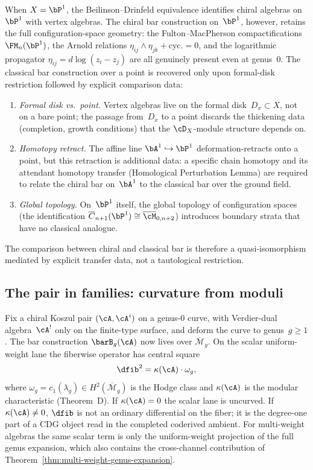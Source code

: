 When $X = \bP^1$, the Beilinson--Drinfeld equivalence identifies chiral algebras on~$\bP^1$ with vertex algebras. The chiral bar construction on~$\bP^1$, however, retains the full configuration-space geometry: the Fulton--MacPherson compactifications~$\FM_n(\bP^1)$, the Arnold relations $\eta_{ij} \wedge \eta_{jk} + \mathrm{cyc.} = 0$, and the logarithmic propagator $\eta_{ij} = d\log(z_i - z_j)$ are all genuinely present even at genus~$0$. The classical bar construction over a point is recovered only upon formal-disk restriction followed by explicit comparison data:
\begin{enumerate}[label=\textup{(\alph*)}]
\item \emph{Formal disk vs.\ point.} Vertex algebras live on the formal disk~$D_x \subset X$, not on a bare point; the passage from~$D_x$ to a point discards the thickening data (completion, growth conditions) that the $\cD_X$-module structure depends on.
\item \emph{Homotopy retract.} The affine line $\bA^1 \hookrightarrow \bP^1$ deformation-retracts onto a point, but this retraction is additional data: a specific chain homotopy and its attendant homotopy transfer (Homological Perturbation Lemma) are required to relate the chiral bar on~$\bA^1$ to the classical bar over the ground field.
\item \emph{Global topology.} On~$\bP^1$ itself, the global topology of configuration spaces (the identification $\overline{C}_{n+1}(\bP^1) \cong \overline{\cM}_{0,n+2}$) introduces boundary strata that have no classical analogue.
\end{enumerate}
The comparison between chiral and classical bar is therefore a quasi-isomorphism mediated by explicit transfer data, not a tautological restriction.

\subsection{The pair in families: curvature from moduli}

Fix a chiral Koszul pair $(\cA,\cA^i)$ on a genus-$0$ curve, with
Verdier-dual algebra~$\cA^!$ only on the finite-type surface, and
deform the curve to genus~$g \geq 1$. The bar construction
$\barB_g(\cA)$ now lives over $\overline{\mathcal{M}}_g$. On the
scalar uniform-weight lane the fiberwise operator has central square
\[
 \dfib^2 = \kappa(\cA)\cdot \omega_g,
\]
where $\omega_g=c_1(\lambda_g)\in H^2(\overline{\mathcal{M}}_g)$ is
the Hodge class and $\kappa(\cA)$ is the modular characteristic
(Theorem~D). If $\kappa(\cA)=0$ the scalar lane is uncurved. If
$\kappa(\cA)\neq0$, $\dfib$ is not an ordinary differential on the
fiber; it is the degree-one part of a CDG object read in the completed
coderived ambient. For multi-weight algebras the same scalar term is
only the uniform-weight projection of the full genus expansion, which
also contains the cross-channel contribution of
Theorem~\ref{thm:multi-weight-genus-expansion}.

